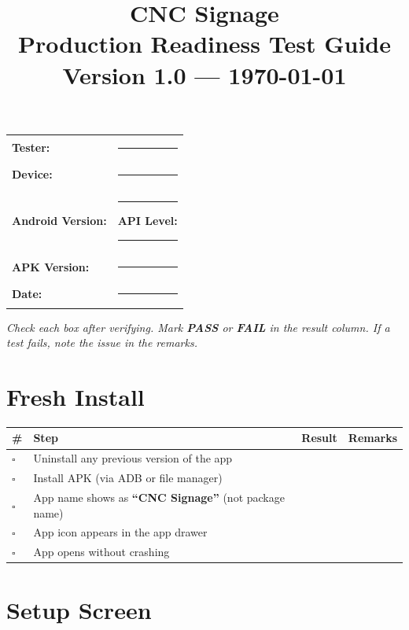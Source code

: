 \documentclass[11pt,a4paper]{article}
\title{%
  \vspace{-1cm}
  {\Huge\textcolor{cncOrange}{\textbf{CNC Signage}}}\\[0.3cm]
  {\Large Production Readiness Test Guide}\\[0.2cm]
  {\normalsize Version 1.0 --- \today}
}
\author{}
\date{}
\newcommand{\checkbox}{$\square$\;}
\newcommand{\pass}{\textcolor{passGreen}{\textbf{PASS}}}
\newcommand{\fail}{\textcolor{failRed}{\textbf{FAIL}}}
\begin{document}
\maketitle
\thispagestyle{fancy}

\noindent
\begin{tabular}{@{}ll}
  \textbf{Tester:} & \rule{6cm}{0.4pt} \\[0.3cm]
  \textbf{Device:} & \rule{6cm}{0.4pt} \\[0.3cm]
  \textbf{Android Version:} & \rule{3cm}{0.4pt} \quad \textbf{API Level:} \rule{2cm}{0.4pt} \\[0.3cm]
  \textbf{APK Version:} & \rule{6cm}{0.4pt} \\[0.3cm]
  \textbf{Date:} & \rule{6cm}{0.4pt} \\
\end{tabular}

\vspace{0.5cm}
\noindent\textit{Check each box after verifying. Mark \pass{} or \fail{} in the result column. If a test fails, note the issue in the remarks.}

\section{Fresh Install}

\begin{tabular}{@{}p{0.5cm}p{10cm}p{2cm}p{3cm}@{}}
\toprule
\textbf{\#} & \textbf{Step} & \textbf{Result} & \textbf{Remarks} \\
\midrule
\checkbox & Uninstall any previous version of the app & & \\[0.3cm]
\checkbox & Install APK (via ADB or file manager) & & \\[0.3cm]
\checkbox & App name shows as \textbf{``CNC Signage''} (not package name) & & \\[0.3cm]
\checkbox & App icon appears in the app drawer & & \\[0.3cm]
\checkbox & App opens without crashing & & \\
\bottomrule
\end{tabular}

\section{Setup Screen}
\end{document}
